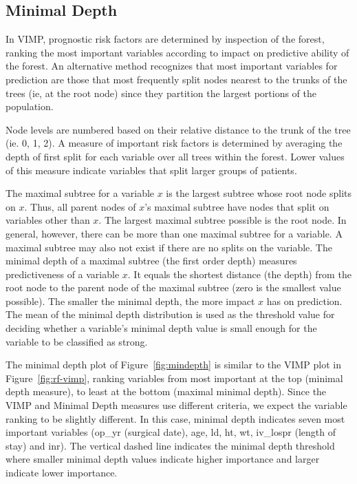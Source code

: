 \documentclass[nojss]{jss}\usepackage[]{graphicx}\usepackage[]{color}
\begin{document}
\subsection{Minimal Depth}\label{S:minimalDepth}
In VIMP, prognostic risk factors are determined by inspection of the forest, ranking the most important variables according to impact on predictive ability of the forest. An alternative method recognizes that most important variables for prediction are those that most frequently split nodes nearest to the trunks of the trees (ie, at the root node) since they partition the largest portions of the population. 

Node levels are numbered based on their relative distance to the trunk of the tree (ie. 0, 1, 2). A measure of important risk factors is determined by averaging the depth of first split for each variable over all trees within the forest. Lower values of this measure indicate variables that split larger groups of patients. 

The maximal subtree for a variable $x$ is the largest subtree whose root node splits on $x$. Thus, all parent nodes of $x$'s maximal subtree have nodes that split on variables other than $x$. The largest maximal subtree possible is the root node. In general, however, there can be more than one maximal subtree for a variable. A maximal subtree may also not exist if there are no splits on the variable. The minimal depth of a maximal subtree (the first order depth) measures predictiveness of a variable $x$. It equals the shortest distance (the depth) from the root node to the parent node of the maximal subtree (zero is the smallest value possible). The smaller the minimal depth, the more impact $x$ has on prediction. The mean of the minimal depth distribution is used as the threshold value for deciding whether a variable's minimal depth value is small enough for the variable to be classified as strong. 

The minimal depth plot of Figure~\ref{fig:mindepth} is similar to the VIMP plot in Figure~\ref{fig:rf-vimp}, ranking variables from most important at the top (minimal depth measure), to least at the bottom (maximal minimal depth). Since the VIMP and Minimal Depth measures use different criteria, we expect the variable ranking to be slightly different. In this case, minimal depth indicates seven most important variables (op\_yr (surgical date), age, ld, ht, wt, iv\_lospr (length of stay) and inr). The vertical dashed line indicates the minimal depth threshold where smaller minimal depth values indicate higher importance and larger indicate lower importance.
\end{document}
